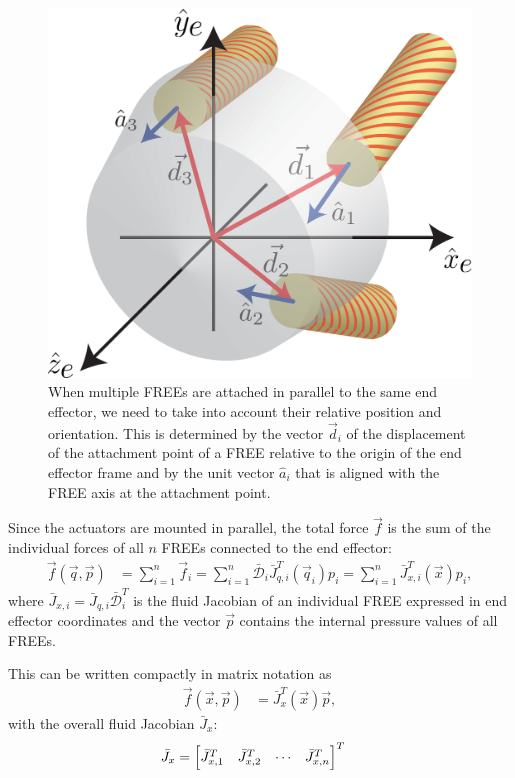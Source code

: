 \begin{figure}
    \centering
    \includegraphics[width=0.65\linewidth]{figures/dp_defined-v7.png}
    \caption{When multiple FREEs are attached in parallel to the same end effector, we need to take into account their relative position and orientation.  This is determined by the vector $\vec{d}_i$ of the displacement of the attachment point of a FREE relative to the origin of the end effector frame and by the unit vector $\hat{a}_i$ that is aligned with the FREE axis at the attachment point.}
    \label{fig:dp_defined}
\end{figure}


Since the actuators are mounted in parallel, the total force $\vec{f}$ is the sum of the individual forces of all $n$ FREEs connected to the end effector: 
\begin{align}
    \vec{f}(\vec{q}, \vec{p}) &= \sum_{i=1}^n \vec{f}_{i} = \sum_{i=1}^n \bar{\mathcal{D}}_i \bar{J}^T_{q, i} (\vec{q}_i) p_i = \sum_{i=1}^n \bar{J}^T_{x, i} (\vec{x}) p_i,
    \label{eq:zeta}
\end{align}
where $\bar{J}_{x, i} = \bar{J}_{q, i} \bar{\mathcal{D}}^T_i$ is the fluid Jacobian of an individual FREE expressed in end effector coordinates and the vector $\vec{p}$ contains the internal pressure values of all FREEs.

This can be written compactly in matrix notation as 
\begin{align}
    \vec{f} (\vec{x}, \vec{p}) &= \bar{J}^T_x (\vec{x}) \vec{p}, \label{DAVIDreallyLIKESthisEQUATION}
\end{align}
with the overall fluid Jacobian $\bar{J}_x$:
\begin{align}
    \bar{J}_x &= \begin{bmatrix} \bar{J}^T_{x, 1} & \bar{J}^T_{x, 2} & \cdots & \bar{J}^T_{x, n} \end{bmatrix}^T
\end{align}

